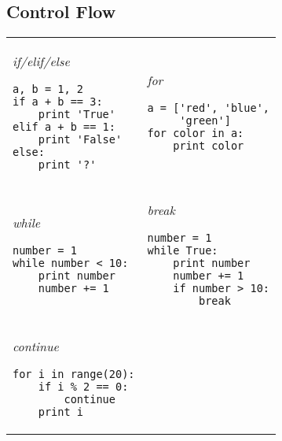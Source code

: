 \documentclass[10pt, a4paper, twocolumn]{article}
\begin{document}
\subsection*{Control Flow}
\begin{tabular}{ p{} p{} }
    \begin{minipage}[t]{\columnwidth}
    \textit{if/elif/else}
\begin{verbatim}
a, b = 1, 2
if a + b == 3:
    print 'True'
elif a + b == 1:
    print 'False'
else:
    print '?'
\end{verbatim}
\end{minipage}
&
\begin{minipage}[t]{\columnwidth}
    \textit{for}
\begin{verbatim}
a = ['red', 'blue',
     'green']
for color in a:
    print color
\end{verbatim}
\end{minipage}\\
\rule{0pt}{0.5cm}

\begin{minipage}[t]{\columnwidth}
    \textit{while}
\begin{verbatim}
number = 1
while number < 10:
    print number
    number += 1
\end{verbatim}
\end{minipage}
&
\begin{minipage}[t]{\columnwidth}
    \textit{break}
\begin{verbatim}
number = 1
while True:
    print number
    number += 1
    if number > 10:
        break
\end{verbatim}
\end{minipage}\\
\rule{0pt}{0.5cm}

\begin{minipage}[t]{\columnwidth}
    \textit{continue}
\begin{verbatim}
for i in range(20):
    if i % 2 == 0:
        continue
    print i
\end{verbatim}
\end{minipage}
&
\end{tabular}
\end{document}
